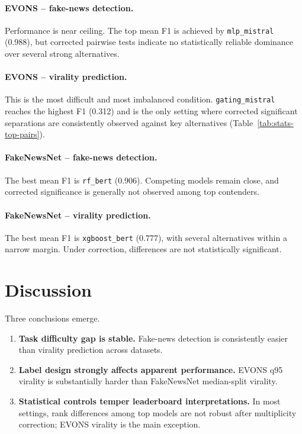 \documentclass[10pt, a4paper]{article}
\begin{document}



\paragraph{EVONS -- fake-news detection.}
Performance is near ceiling. The top mean F1 is achieved by \texttt{mlp\_mistral} (0.988), but corrected pairwise tests indicate no statistically reliable dominance over several strong alternatives.

\paragraph{EVONS -- virality prediction.}
This is the most difficult and most imbalanced condition. \texttt{gating\_mistral} reaches the highest F1 (0.312) and is the only setting where corrected significant separations are consistently observed against key alternatives (Table~\ref{tab:stats-top-pairs}).

\paragraph{FakeNewsNet -- fake-news detection.}
The best mean F1 is \texttt{rf\_bert} (0.906). Competing models remain close, and corrected significance is generally not observed among top contenders.

\paragraph{FakeNewsNet -- virality prediction.}
The best mean F1 is \texttt{xgboost\_bert} (0.777), with several alternatives within a narrow margin. Under correction, differences are not statistically significant.

\section{Discussion}
\label{sec:discussion}

Three conclusions emerge.

\begin{enumerate}
  \item \textbf{Task difficulty gap is stable.} Fake-news detection is consistently easier than virality prediction across datasets.
  \item \textbf{Label design strongly affects apparent performance.} EVONS q95 virality is substantially harder than FakeNewsNet median-split virality.
  \item \textbf{Statistical controls temper leaderboard interpretations.} In most settings, rank differences among top models are not robust after multiplicity correction; EVONS virality is the main exception.
\end{enumerate}
\end{document}

